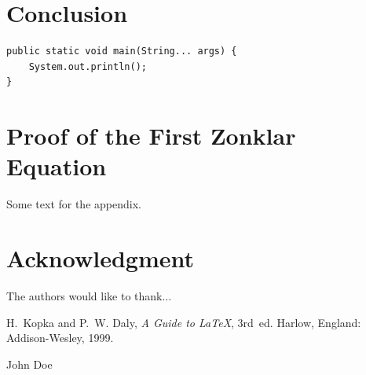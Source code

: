 \documentclass[journal]{IEEEtran}
\begin{document}
\section{Conclusion}
\blindtext

\begin{verbatim}
public static void main(String... args) {
    System.out.println();
}
\end{verbatim}

\appendices
\section{Proof of the First Zonklar Equation}
Some text for the appendix.

\section*{Acknowledgment}

The authors would like to thank...

\begin{thebibliography}{1}

\bibitem{}
H.~Kopka and P.~W. Daly, \emph{A Guide to \LaTeX}, 3rd~ed. Harlow, England: Addison-Wesley, 1999.

\end{thebibliography}

\begin{IEEEbiography}{John Doe}
\blindtext
\end{IEEEbiography}
\end{document}
